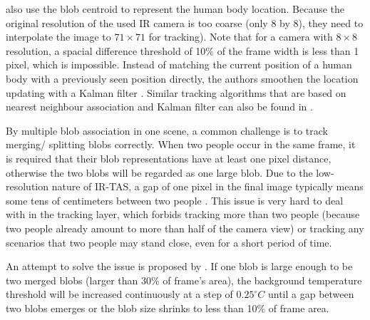 \citeauthor{mika} \cite{mika} also use the blob centroid to represent the human body location. Because the original resolution of the used IR camera is too coarse (only 8 by 8), they need to interpolate the image to $71\times71$ for tracking). Note that for a camera with $8\times8$ resolution, a spacial difference threshold of 10\% of the frame width is less than 1 pixel, which is impossible. Instead of matching the current position of a human body with a previously seen position directly, the authors smoothen the location updating with a Kalman filter \cite{kalmanfilter}. Similar tracking algorithms that are based on nearest neighbour association and Kalman filter can also be found in \cite{melexis,virtualtrack}.

By multiple blob association in one scene, a common challenge is to track merging/ splitting blobs correctly. When two people occur in the same frame, it is required that their blob representations have at least one pixel distance, otherwise the two blobs will be regarded as one large blob. Due to the low-resolution nature of IR-TAS, a gap of one pixel in the final image typically means some tens of centimeters between two people \cite{mika}. This issue is very hard to deal with in the tracking layer, which forbids tracking more than two people (because two people already amount to more than half of the camera view) or tracking any scenarios that two people may stand close, even for a short period of time.

An attempt to solve the issue is proposed by \cite{firstflow}. If one blob is large enough to be two merged blobs (larger than 30\% of frame's area), the background temperature threshold will be increased continuously at a step of $0.25^\circ C$ until a gap between two blobs emerges or the blob size shrinks to less than 10\% of frame area.

